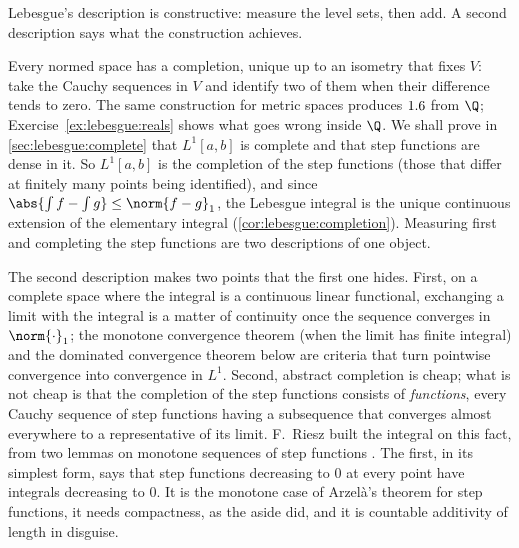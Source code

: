 \begin{refsection}
Lebesgue's description is constructive: measure the level sets, then add. A second description says what the construction achieves.


Every normed space has a completion, unique up to an isometry that fixes $V$: take the Cauchy sequences in $V$ and identify two of them when their difference tends to zero. The same construction for metric spaces produces $1.6$ from $\Q$; Exercise~\ref{ex:lebesgue:reals} shows what goes wrong inside $\Q$. We shall prove in \cref{sec:lebesgue:complete} that $L^1[a,b]$ is complete and that step functions are dense in it. So $L^1[a,b]$ is the completion of the step functions (those that differ at finitely many points being identified), and since $\abs{\int f-\int g}\le\norm{f-g}_1$, the Lebesgue integral is the unique continuous extension of the elementary integral (\cref{cor:lebesgue:completion}). Measuring first and completing the step functions are two descriptions of one object.

The second description makes two points that the first one hides. First, on a complete space where the integral is a continuous linear functional, exchanging a limit with the integral is a matter of continuity once the sequence converges in $\norm{\cdot}_1$; the monotone convergence theorem (when the limit has finite integral) and the dominated convergence theorem below are criteria that turn pointwise convergence into convergence in $L^1$. Second, abstract completion is cheap; what is not cheap is that the completion of the step functions consists of \emph{functions}, every Cauchy sequence of step functions having a subsequence that converges almost everywhere to a representative of its limit. F.~Riesz built the integral on this fact, from two lemmas on monotone sequences of step functions \parencite{RieszSzNagy1952}. The first, in its simplest form, says that step functions decreasing to $0$ at every point have integrals decreasing to $0$. It is the monotone case of Arzelà's theorem for step functions, it needs compactness, as the aside did, and it is countable additivity of length in disguise.


\end{refsection}
